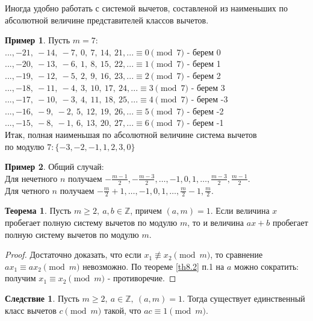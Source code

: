\documentclass[a4paper, 12pt]{article}
\newcommand{\Z}{\mathbb{Z}}
\theoremstyle{definition}
\newtheorem{theorem}{Теорема}[section]
\newtheorem*{consequense}{Следствие}
\newtheorem*{example}{Пример}
\begin{document}
    Иногда удобно работать с системой вычетов, составленой из наименьших по абсолютной величине представителей классов вычетов.
    \begin{example}
        Пусть $m=7$:\\
        $...,-21,\ -14,\ -7,\ 0,\ 7,\ 14,\ 21,... \equiv 0 \pmod{7}$ - берем 0\\
        $...,-20,\ -13,\ -6,\ 1,\ 8,\ 15,\ 22,... \equiv 1 \pmod{7}$ - берем 1\\
        $...,-19,\ -12,\ -5,\ 2,\ 9,\ 16,\ 23,... \equiv 2 \pmod{7}$ - берем 2\\
        $...,-18,\ -11,\ -4,\ 3,\ 10,\ 17,\ 24,... \equiv 3 \pmod{7}$ - берем 3\\
        $...,-17,\ -10,\ -3,\ 4,\ 11,\ 18,\ 25,... \equiv 4 \pmod{7}$ - берем -3\\
        $...,-16,\ -9,\ -2,\ 5,\ 12,\ 19,\ 26,... \equiv 5 \pmod{7}$ - берем -2\\
        $...,-15,\ -8,\ -1,\ 6,\ 13,\ 20,\ 27,... \equiv 6 \pmod{7}$ - берем -1\\
        Итак, полная наименьшая по абсолютной величине система вычетов\\ 
        по модулю $7: \{-3,-2,-1,1,2,3,0\}$
    \end{example}
    \begin{example}
        Общий случай:\\
        Для нечетного $n$ получаем $-\frac{m-1}{2},-\frac{m-3}{2},\dots,-1,0,1,\dots,\frac{m-3}{2},\frac{m-1}{2}$.\\
        Для четного $n$ получаем $-\frac{m}{2}+1,\dots,-1,0,1,\dots,\frac{m}{2}-1,\frac{m}{2}$.
    \end{example}
    \begin{theorem} \label{th8.4}
        Пусть $m\geq 2,\ a,b\in \Z$, причем $(a,m)=1$. Если величина $x$ пробегает полную систему вычетов по модулю $m$, то и величина $ax+b$ пробегает полную систему вычетов по модулю $m$.
    \end{theorem} 
    \begin{proof}
        Достаточно доказать, что если $x_1\not\equiv x_2 \pmod{m}$, то сравнение $ax_1\equiv ax_2 \pmod{m}$ невозможно. По теореме \ref{th8.2} п.1 на $a$ можно сократить: получим $x_1 \equiv x_2 \pmod{m}$ - противоречие.
    \end{proof} 
    \begin{consequense}
        Пусть $m\geq 2,\ a\in \Z,\ (a,m)=1$. Тогда существует единственный класс вычетов $c \pmod{m}$ такой, что $ac\equiv 1 \pmod{m}$.
    \end{consequense} 
\end{document}
